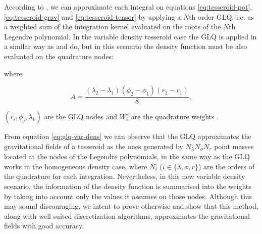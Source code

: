\documentclass[extra]{gji}
\begin{document}
According to \citet[p.~390]{Hildebrand1987}, we can approximate each 
integral on equations \ref{eq:tesseroid-pot}, \ref{eq:tesseroid-grav} 
and \ref{eq:tesseroid-tensor} by applying a $N$th order GLQ, i.e. as 
a weighted sum of the integration kernel evaluated on the roots of the 
$N$th Legendre polynomial.
In the variable density tesseroid case the GLQ is applied in a similar 
way as \citet{Asgharzadeh2007} and \citet{Uieda2016} do, but in this 
scenario the density function must be also evaluated on the quadrature 
nodes:


\noindent where

\begin{equation}
    A = 
    \frac{(\lambda_2 - \lambda_1)(\phi_2 - \phi_1)(r_2 - r_1)}{8},
\end{equation}

\noindent $(r_i, \phi_j, \lambda_k)$ are the GLQ nodes and $W_i^r$ are 
the quadrature weights \citep[see their definitions 
on][]{Hildebrand1987}.

From equation \ref{eq:glq-var-dens} we can observe that the GLQ approximates 
the gravitational fields of a tesseroid as the ones generated by $N_\lambda 
N_\phi N_r$ point masses located at the nodes of the Legendre polynomials, in 
the same way as the GLQ works in the homogeneous density case, where $N_i$ ($i 
\in \{ \lambda, \phi, r \}$) are the orders of the quadrature for each 
integration.
Nevertheless, in this new variable density scenario, the information of 
the density function is summarised into the weights by taking into 
account only the values it assumes on those nodes.
Although this may sound discouraging, we intent to prove otherwise and 
show that this method, along with well suited discretization 
algorithms, approximates the gravitational fields with good accuracy.
\end{document}

